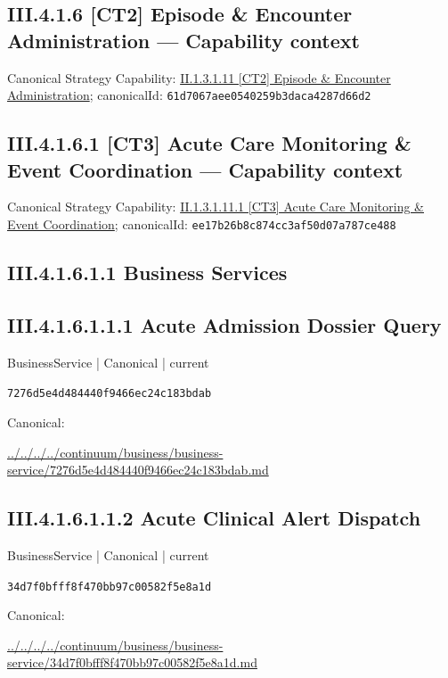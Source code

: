\documentclass[10pt,a4paper]{article}
\begin{document}
\subsection*{III.4.1.6 [CT2] Episode \& Encounter Administration — Capability context}
Canonical Strategy Capability: \hyperref[element-61d7067aee0540259b3daca4287d66d2]{II.1.3.1.11 [CT2] Episode \& Encounter Administration}; canonicalId: \texttt{61d7067aee0540259b3daca4287d66d2}\par
\subsection*{III.4.1.6.1 [CT3] Acute Care Monitoring \& Event Coordination — Capability context}
Canonical Strategy Capability: \hyperref[element-ee17b26b8c874cc3af50d07a787ce488]{II.1.3.1.11.1 [CT3] Acute Care Monitoring \& Event Coordination}; canonicalId: \texttt{ee17b26b8c874cc3af50d07a787ce488}\par
\subsection*{III.4.1.6.1.1 Business Services}
\subsection*{III.4.1.6.1.1.1 Acute Admission Dossier Query}
\label{element-7276d5e4d484440f9466ec24c183bdab}
{\small BusinessService | Canonical | current}\par
\texttt{7276d5e4d484440f9466ec24c183bdab}\par
Canonical: \par
{\footnotesize\url{../../../../continuum/business/business-service/7276d5e4d484440f9466ec24c183bdab.md}}\par
\subsection*{III.4.1.6.1.1.2 Acute Clinical Alert Dispatch}
\label{element-34d7f0bfff8f470bb97c00582f5e8a1d}
{\small BusinessService | Canonical | current}\par
\texttt{34d7f0bfff8f470bb97c00582f5e8a1d}\par
Canonical: \par
{\footnotesize\url{../../../../continuum/business/business-service/34d7f0bfff8f470bb97c00582f5e8a1d.md}}\par
\end{document}
